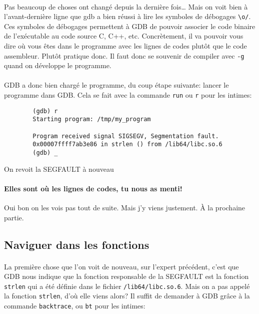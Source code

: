 \paragraph{} Pas beaucoup de choses ont changé depuis la dernière fois\ldots
Mais on voit bien à l'avant-dernière ligne que gdb a bien réussi à lire les
symboles de débogages \texttt{{\textbackslash}o/}. Ces symboles de débogages
permettent à GDB de pouvoir associer le code binaire de l'exécutable au code
source C, C++, etc. Concrètement, il va pouvoir vous dire où vous êtes dans le
programme avec les lignes de codes plutôt que le code assembleur. Plutôt
pratique donc. Il faut donc se souvenir de compiler avec \texttt{-g} quand on
développe le programme.

\paragraph{} GDB a donc bien chargé le programme, du coup étape suivante:
lancer le programme dans GDB. Cela se fait avec la commande \texttt{run} ou
\texttt{r} pour les intimes:

\begin{listing}[H]
	\begin{verbatim}
		(gdb) r
		Starting program: /tmp/my_program

		Program received signal SIGSEGV, Segmentation fault.
		0x00007ffff7ab3e86 in strlen () from /lib64/libc.so.6
		(gdb) _
	\end{verbatim}
	\caption{On revoit la SEGFAULT à nouveau}
\end{listing}

\paragraph{Elles sont où les lignes de codes, tu nous as menti!} Oui bon on les
vois pas tout de suite. Mais j'y viens justement. À la prochaine partie.

\subsection{Naviguer dans les fonctions}

\paragraph{} La première chose que l'on voit de nouveau, sur l'expert
précédent, c'est que GDB nous indique que la fonction responsable de la
SEGFAULT est la fonction \texttt{strlen} qui a été définie dans le
fichier \texttt{/lib64/libc.so.6}. Mais on a pas appelé la fonction
\texttt{strlen}, d'où elle viens alors? Il suffit de demander à GDB
grâce à la commande \texttt{backtrace}, ou \texttt{bt} pour les intimes:

